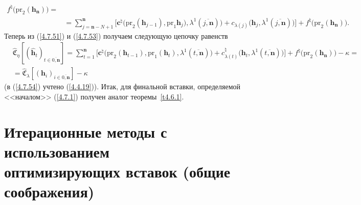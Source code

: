 \documentclass[12pt,twoside]{report}
\newcommand{\ov}{\overline}
\newcommand{\la}{\lambda}
\newcommand{\zc}{{\mathbf c}}
\newcommand{\nn}{{\mathbf n}}
\begin{document}
{{\begin{eqnarray}
f^\natural\bigl(\mathrm{pr}_2(\mathbf{h}_\nn)\bigl)=
&\nonumber\\
&= \sum\limits_{j=\nn-N+1}^\nn\bigl[\zc^\natural\bigl(\mathrm{pr}_2(\mathbf{h}_{j-1}),\mathrm{pr}_1
\mathbf{h}_j),\la^1(\ov{j,\nn})\bigl) + c_{\la(j)}\bigl(\mathbf{h}_j,\la^1(\ov{j,\nn})\bigl)\bigl]+
f^\natural\bigl(\mathrm{pr}_2(\mathbf{h}_\nn)\bigl).
&\label{4.7.53}
\end{eqnarray}
Теперь из (\ref{4.7.51}) и (\ref{4.7.53}) получаем следующую цепочку равенств
\begin{eqnarray}
&\widehat{\mathfrak{C}}_\eta[(\hat{\mathbf{h}}_t)_{t\in\ov{0,\nn}}] =
\sum\limits_{t=1}^\nn\bigl[\zc^\natural\bigl(\mathrm{pr}_2(\mathbf{h}_{t-1}),\mathrm{pr}_1
(\mathbf{h}_t),\la^1(\ov{t,\nn})\bigl) + c_{\la(t)}^\natural\bigl(\mathbf{h}_t,
\la^1(\ov{t,\nn})\bigl)\bigl]+ f^\natural\bigl(\mathrm{pr}_2(\mathbf{h}_\nn)\bigl)- \kappa =
&\nonumber\\
&=\widehat{\mathfrak{C}}_\la[(\mathbf{h}_i)_{i\in\ov{0,\nn}}]-\kappa
&\label{4.7.54}
\end{eqnarray}
(в (\ref{4.7.54}) учтено (\ref{4.4.19})). Итак,   для финальной вставки, определяемой <<началом>>
(\ref{4.7.1}) получен аналог теоремы~\ref{t4.6.1}.

\section{Итерационные методы с использованием\\ оптимизирующих вставок (общие соображения)}
\setcounter{equation}{-1}

}}
\end{document}
